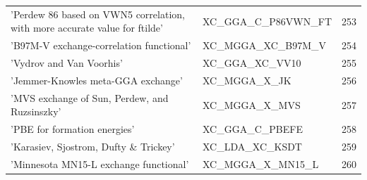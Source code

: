 \documentclass[final,12pt,makeidx,DIV=calc]{article}
\begin{document}
{{{{{{\begin{table}[!h]
\begin{center}
\begin{tabular}{llr}
  'Perdew 86 based on VWN5 correlation, with more accurate value for ftilde' & XC\_GGA\_C\_P86VWN\_FT  &253\\
  'B97M-V exchange-correlation functional' & XC\_MGGA\_XC\_B97M\_V  &254\\
  'Vydrov and Van Voorhis' & XC\_GGA\_XC\_VV10  &255\\
  'Jemmer-Knowles meta-GGA exchange' & XC\_MGGA\_X\_JK  &256\\
  'MVS exchange of Sun, Perdew, and Ruzsinszky' & XC\_MGGA\_X\_MVS  &257\\
  'PBE for formation energies' & XC\_GGA\_C\_PBEFE  &258\\
  'Karasiev, Sjostrom, Dufty \& Trickey' & XC\_LDA\_XC\_KSDT  &259\\
  'Minnesota MN15-L exchange functional' & XC\_MGGA\_X\_MN15\_L  &260\\
\hline
\hline
\end{tabular}
\end{center}
\end{table}

}}}}}}
\end{document}
